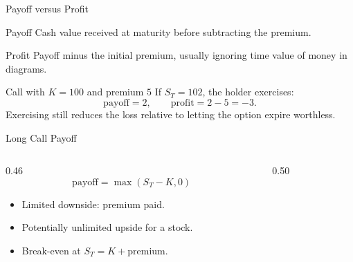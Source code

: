 \documentclass[aspectratio=169,11pt]{beamer}
\begin{document}
\begin{frame}{Payoff versus Profit}
    \begin{block}{Payoff}
        Cash value received at maturity before subtracting the premium.
    \end{block}

    \begin{block}{Profit}
        Payoff minus the initial premium, usually ignoring time value of money in diagrams.
    \end{block}

    \begin{exampleblock}{Call with \(K=100\) and premium \(5\)}
        If \(S_T=102\), the holder exercises:
        \[
            \text{payoff}=2,
            \qquad
            \text{profit}=2-5=-3.
        \]
        Exercising still reduces the loss relative to letting the option expire worthless.
    \end{exampleblock}
\end{frame}

\begin{frame}{Long Call Payoff}
    \begin{columns}[T]
        \begin{column}{0.46\textwidth}
            \[
                \text{payoff}=\max(S_T-K,0)
            \]
            \begin{itemize}
                \item Limited downside: premium paid.
                \item Potentially unlimited upside for a stock.
                \item Break-even at \(S_T=K+\text{premium}\).
            \end{itemize}
        \end{column}
        \begin{column}{0.50\textwidth}
            \begin{center}
            \end{center}
        \end{column}
    \end{columns}
\end{frame}
\end{document}
